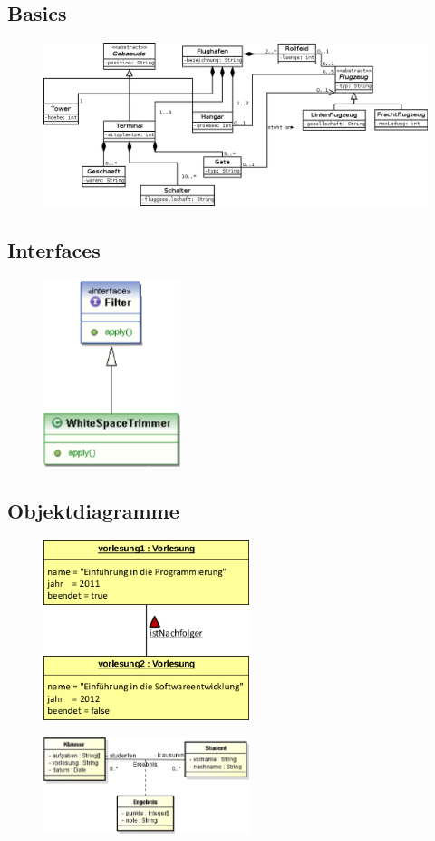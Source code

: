 \subsection{Basics}
\begin{figure}[H]
\includegraphics[width=15cm]{mainmatter/pics/Flughafen.png}
\end{figure}

\subsection{Interfaces}
\begin{figure}[H]
\includegraphics[width=4cm]{mainmatter/pics/interfaces.png}
\end{figure}

\subsection{Objektdiagramme}
\begin{figure}[H]
\includegraphics[width=6cm]{mainmatter/pics/objektdiagramm.png}
\end{figure}
\begin{figure}[H]
\includegraphics[width=6cm]{mainmatter/pics/zwischending.png}
\end{figure}
